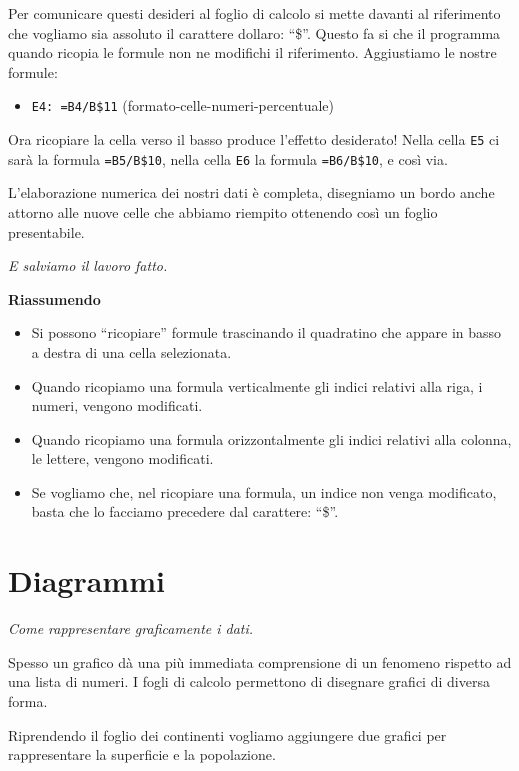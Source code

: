 Per comunicare questi desideri al foglio di calcolo si mette davanti
al riferimento che vogliamo sia assoluto il carattere dollaro: ``\$''.
Questo fa si che il programma quando ricopia le formule non ne modifichi
il riferimento.
Aggiustiamo le nostre formule:

\begin{itemize} [noitemsep]
\item \texttt{E4: =B4/B\$11}
(formato-celle-numeri-percentuale)
\end{itemize}

Ora ricopiare la cella verso il basso produce l'effetto desiderato!
Nella cella \texttt{E5} ci sarà la formula \texttt{=B5/B\$10},
nella cella \texttt{E6} la formula \texttt{=B6/B\$10}, e così via.

L'elaborazione numerica dei nostri dati è completa,
disegniamo un bordo anche attorno alle nuove celle che abbiamo
riempito ottenendo così un foglio presentabile.

\emph{E salviamo il lavoro fatto.}

\textbf{Riassumendo}
\begin{itemize} [noitemsep]
\item 
Si possono ``ricopiare'' formule trascinando il quadratino che appare in
basso a destra di una cella selezionata.
\item 
Quando ricopiamo una formula verticalmente gli indici relativi alla riga,
i numeri, vengono modificati.
\item 
Quando ricopiamo una formula orizzontalmente gli indici relativi alla
colonna, le lettere, vengono modificati.
\item 
Se vogliamo che, nel ricopiare una formula, un indice non venga modificato,
basta che lo facciamo precedere dal carattere: ``\$''.
\end{itemize}

\section{Diagrammi}
\label{05_01_f_di_calc:diagrammi}

\emph{Come rappresentare graficamente i dati.}

Spesso un grafico dà una più immediata comprensione di un fenomeno rispetto
ad una lista di numeri.
I fogli di calcolo permettono di disegnare grafici di diversa forma.

Riprendendo il foglio dei continenti vogliamo aggiungere due grafici per
rappresentare la superficie e la popolazione.

